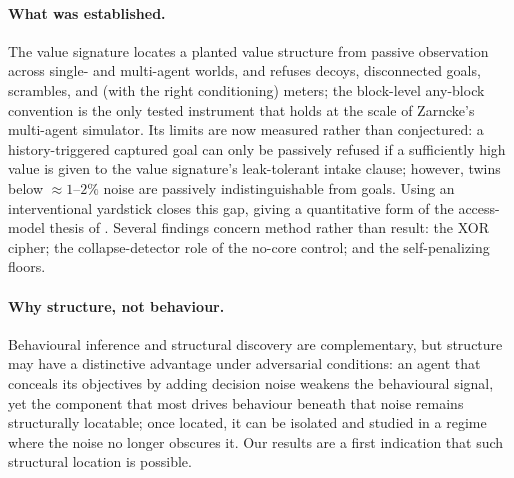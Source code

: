 \documentclass[11pt]{article}
\begin{document}
\paragraph{What was established.}
The value signature locates a planted value structure from passive
observation across single- and multi-agent worlds, and refuses decoys,
disconnected goals, scrambles, and (with the right conditioning) meters; the block-level
any-block convention is the only tested instrument that holds at the scale of Zarncke's
multi-agent simulator. Its limits are now measured rather than conjectured:
a history-triggered captured goal can only be passively refused if a sufficiently high
value is given to the value signature's leak-tolerant intake clause; however, twins
below $\approx 1$--$2\%$ noise are passively indistinguishable from goals. Using an
interventional yardstick closes this gap, giving a quantitative form of the
access-model thesis of \citet{zarncke2025uad}.
Several findings concern method rather than result: the XOR cipher; the
collapse-detector role of the no-core control; and the self-penalizing floors.

\paragraph{Why structure, not behaviour.}
Behavioural inference and structural discovery are complementary, but structure may have a
distinctive advantage under adversarial conditions: an agent that conceals its
objectives by adding decision noise weakens the behavioural signal, yet the component
that most drives behaviour beneath that noise remains structurally locatable; once
located, it can be isolated and studied in a regime where the noise no longer obscures
it. Our results are a first indication that such structural location is possible.
\end{document}
